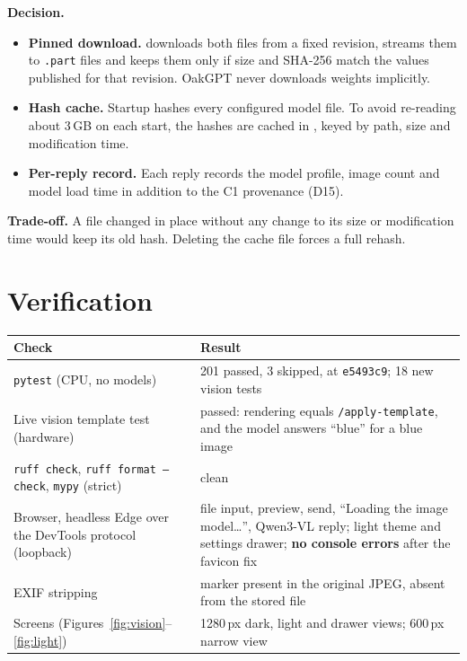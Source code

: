 \documentclass[11pt,a4paper]{article}
\newcommand{\code}[1]{\texttt{#1}}
\newcommand{\field}[1]{\textbf{#1}\quad}
\begin{document}
\field{Decision.}
\begin{itemize}
  \item \textbf{Pinned download.}  downloads both
        files from a fixed revision, streams them to \code{.part} files and keeps them
        only if size and SHA-256 match the values published for that revision. OakGPT
        never downloads weights implicitly.
  \item \textbf{Hash cache.} Startup hashes every configured model file. To avoid
        re-reading about 3\,GB on each start, the hashes are cached in
        , keyed by path, size and modification time.
  \item \textbf{Per-reply record.} Each reply records the model profile, image count and
        model load time in addition to the C1 provenance (D15).
\end{itemize}

\field{Trade-off.} A file changed in place without any change to its size or modification
time would keep its old hash. Deleting the cache file forces a full rehash.

\section{Verification}

\begin{center}
\small
\begin{tabularx}{\textwidth}{@{}>{\raggedright\arraybackslash}p{}Y@{}}
\toprule
Check & Result \\
\midrule
\code{pytest} (CPU, no models) & 201 passed, 3 skipped, at \code{e5493c9}; 18 new vision
  tests \\
Live vision template test (hardware) & passed: rendering equals
  \code{/apply-template}, and the model answers ``blue'' for a blue image \\
\code{ruff check}, \code{ruff format --check}, \code{mypy} (strict) & clean \\
Browser, headless Edge over the DevTools protocol (loopback) & file input, preview,
  send, ``Loading the image model\ldots'', Qwen3-VL reply; light theme and settings
  drawer; \textbf{no console errors} after the favicon fix \\
EXIF stripping & marker present in the original JPEG, absent from the stored file \\
Screens (Figures~\ref{fig:vision}--\ref{fig:light}) & 1280\,px dark, light and drawer
  views; 600\,px narrow view \\
\bottomrule
\end{tabularx}
\end{center}
\end{document}
